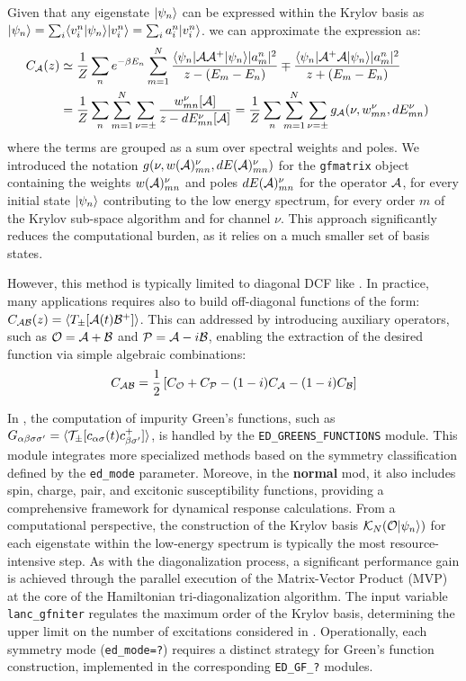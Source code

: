 \documentclass[edipack2.tex]{subfiles}
\begin{document}
Given that any eigenstate $\ket{\psi_n}$ can be expressed within the
Krylov basis as
$\ket{\psi_n} = \sum_i  \ibra v^n_i|\psi_n \iket  \ket{ v^n_i} =
\sum_i a^n_i \ket{v^n_i}$. we can approximate the expression
 as:  
\begin{equation}
  \label{eqGKrylov}
  \begin{split}
    C_\AA(z)  &\simeq \frac{1}{Z}\sum_n e^{-\beta E_n}
    \sum_{m=1}^{N} \frac{\bra{\psi_n}\AA \AA^+\ket{\psi_n} |a^n_m|^2}{
      z - (E_m-E_n)} \mp \frac{\bra{\psi_n}\AA^+ \AA\ket{\psi_n}
      |a^n_m|^2}{ z + (E_m-E_n)}\cr
    &= \frac{1}{Z}\sum_n\sum_{m=1}^{N} \sum_{\nu=\pm}\frac{w^{\nu}_{mn}[\AA]}{z - dE^\nu_{mn}[\AA]} 
    = \frac{1}{Z}\sum_n
    \sum_{m=1}^{N} \sum_{\nu=\pm} g_\AA(\nu, w^{\nu}_{mn},  dE^\nu_{mn}) \cr
  \end{split}
\end{equation}
where the terms are grouped as a sum over spectral weights and
poles. We introduced the notation $g(\nu, w(\AA)^{\nu}_{mn},  dE(\AA)^\nu_{mn})$
for the {\tt gfmatrix} object containing the weights $w(\AA)^{\nu}_{mn}$ and
poles $dE(\AA)^{\nu}_{mn}$ for the operator $\AA$, for every initial state $\ket{\psi_n}$
contributing to the low energy spectrum, for every order $m$ of the
Krylov sub-space algorithm and for channel $\nu$.
This approach significantly reduces the computational burden, as it
relies on a much smaller set of basis states.


However, this method is typically limited to diagonal DCF like
. In practice, many applications requires also to build off-diagonal
functions of the form:
$C_{\AA\BB}(z) = \ibra T_{\pm}[\AA(t) \BB^+]\iket$.
This can addressed by introducing auxiliary operators, such as $\OO=\AA +\BB$ and
$\PP=\AA-i\BB$, enabling the extraction of the desired function via
simple algebraic combinations:
$$
C_{\AA\BB} = \frac{1}{2}\left[C_\OO + C_\PP - (1-i)C_\AA -(1-i)C_\BB\right]
$$


In \NAME, the computation of impurity Green's functions, such as
$G_{\a\b\s\s'}=\ibra \TT_\pm[ c_{\a\s}(t) c_{\b\s'}^+ ]\iket$,
is handled by the \texttt{ED\_GREENS\_FUNCTIONS} module.
This
module integrates more specialized methods based on the symmetry
classification defined by the \texttt{ed\_mode} parameter.
Moreove, in the {\bf normal} mod, it also includes spin, charge, pair, and excitonic
susceptibility functions, providing a comprehensive framework for
dynamical response calculations.
From a computational perspective, the construction of the Krylov basis
$\mathcal{K}_N(\OO\ket{\psi_n})$ for each eigenstate within the low-energy
spectrum is typically the most resource-intensive step.
As with the
diagonalization process, a significant performance gain is achieved through
the parallel execution of the Matrix-Vector Product (MVP) at the core of
the Hamiltonian tri-diagonalization algorithm.
The input variable
\texttt{lanc\_gfniter} regulates the maximum order of the Krylov basis,
determining the upper limit on the number of excitations considered in
.
Operationally, each symmetry mode (\texttt{ed\_mode=?}) requires a distinct
strategy for Green's function construction, implemented in the corresponding
\texttt{ED\_GF\_?} modules.
\end{document}
